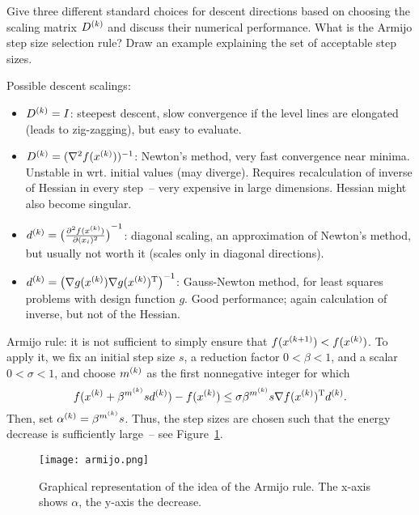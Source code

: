 \documentclass{article}
\begin{document}
\begin{question}
  Give three different standard choices for descent directions based on choosing the scaling matrix
  \(\kth{D}\) and discuss their numerical performance. What is the Armijo step size selection
  rule? Draw an example explaining the set of acceptable step sizes.
\end{question}
Possible descent scalings:
\begin{itemize}
\item \(\kth{D} = I\): steepest descent, slow convergence if the level lines are elongated (leads to
  zig-zagging), but easy to evaluate.
\item \(\kth{D} = (\nabla^2 f(\kth{x}))^{-1}\): Newton's method, very fast convergence near minima.
  Unstable in wrt. initial values (may diverge).  Requires recalculation of inverse of Hessian in
  every step~-- very expensive in large dimensions.  Hessian might also become singular.
\item \(\kth{d} = \del[1]{\pd[2]{f(\kth{x})}{(x_i)}}^{-1}\): diagonal scaling, an approximation of
  Newton's method, but usually not worth it (scales only in diagonal directions).
\item \(\kth{d} = \del[1]{\nabla g(\kth{x}) \T{\nabla g(\kth{x})}}^{-1}\): Gauss-Newton method, for
  least squares problems with design function \(g\). Good performance; again calculation of inverse,
  but not of the Hessian.
\end{itemize}

Armijo rule: it is not sufficient to simply ensure that \(f(\kth[k+1]{x}) < f(\kth{x})\). To apply
it, we fix an initial step size \(s\), a reduction factor \(0 < \beta < 1\), and a scalar
\(0 < \sigma < 1\), and choose \(\kth{m}\) as the first nonnegative integer for which
\begin{equation*}
  f(\kth{x} + \beta^{\kth{m}} s \kth{d}) - f(\kth{x}) \leq \sigma \beta^{\kth{m}} s \nabla \T{f(\kth{x})} \kth{d}.
\end{equation*}
Then, set \(\kth{\alpha} = \beta^{\kth{m}} s\).  Thus, the step sizes are chosen such that the
energy decrease is sufficiently large~-- see Figure~\ref{fig:armijo}.
\begin{figure}[H]
  \centering
  \texttt{[image: armijo.png]}
  \caption{Graphical representation of the idea of the Armijo rule.  The x-axis shows \(\alpha\),
    the y-axis the decrease.\label{fig:armijo}}
\end{figure}
\end{document}
